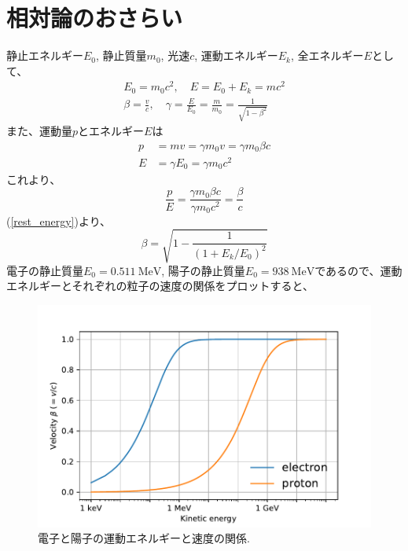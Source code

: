 \documentclass[10pt,a4paper]{jlreq}
\begin{document}
\clearpage

\appendix
\renewcommand{\theequation}{\Alph{section}.\arabic{equation} }
\setcounter{equation}{0}

\section{相対論のおさらい}
静止エネルギー$E_0$, 静止質量$m_0$, 光速$c$, 運動エネルギー$E_k$, 全エネルギー$E$として、
%
\begin{equation}
  \begin{split}
    E_0 = m_0 c^2 ,\quad E = E_0 + E_k = mc^2\\
    \beta =\frac{v}{c}, \quad \gamma = \frac{E}{E_0}=\frac{m}{m_0}=\frac{1}{\sqrt{1-\beta^2}}
    \label{rest_energy}
  \end{split}
\end{equation}
%
また、運動量$p$とエネルギー$E$は
\begin{align}
  p &= mv = \gamma m_0 v = \gamma m_0 \beta c \label{momentum} \\
  E &= \gamma E_0 = \gamma m_0 c^2 \label{energy}
\end{align}
%
これより、
%
\begin{equation}
  \frac{p}{E} = \frac{\gamma m_0 \beta c}{\gamma m_0 c^2} = \frac{\beta}{c}
\end{equation}
%
(\ref{rest_energy})より、
%
\begin{equation}
  \beta = \sqrt{1-\frac{1}{\left(1+ E_k/E_0\right)^2}}
\end{equation}
%
電子の静止質量$E_0 = \SI{0.511}{\mega\electronvolt}$, 陽子の静止質量$E_0 = \SI{938}{\mega\electronvolt}$であるので、運動エネルギーとそれぞれの粒子の速度の関係をプロットすると、

\begin{figure}[hhbt]
  \begin{center}
    \includegraphics[width=12cm,clip]{figs/velocity.pdf}
    \caption{電子と陽子の運動エネルギーと速度の関係.}
    \label{velocity}
  \end{center}
\end{figure}
\end{document}
